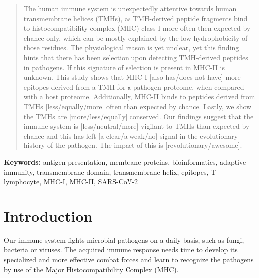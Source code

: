 \begin{abstract}

The human immune system is unexpectedly attentive towards
human transmembrane helices (TMHs), as TMH-derived peptide fragments
bind to histocompatibility complex (MHC) class I more often then expected
by chance only, which can be mostly explained by the low hydrophobicity
of those residues.
The physiological reason is yet unclear,
yet this finding hints that there has been selection upon detecting TMH-derived
peptides in pathogens.
If this signature of selection is present in MHC-II is unknown.
This study shows that MHC-I [also has/does not have] more
epitopes derived from a TMH for a pathogen proteome, when compared with
a host proteome.
Additionally, MHC-II binds to peptides derived from TMHs 
[less/equally/more] often than expected by chance.
Lastly, we show the TMHs are [more/less/equally] 
conserved.
Our findings suggest that the immune system is [less/neutral/more]
vigilant to TMHs than expected by chance and this has 
left [a clear/a weak/no]
signal in the evolutionary history of the pathogen.
The impact of this is [revolutionary/awesome].

\end{abstract}

{\bf Keywords:} antigen presentation, membrane proteins, bioinformatics, 
adaptive immunity, transmembrane domain, transmembrane helix, 
epitopes, T lymphocyte, MHC-I, MHC-II, SARS-CoV-2

\section{Introduction}


Our immune system fights microbial pathogens on a daily basis,
such as fungi, bacteria or viruses.
The acquired immune response
needs time to develop its specialized and more effective
combat forces and learn to recognize the pathogens 
by use of the Major Histocompatibility Complex (MHC).


